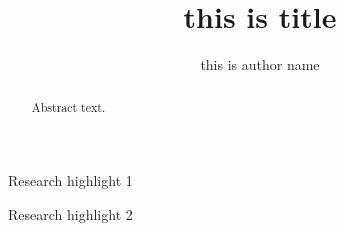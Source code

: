 \documentclass[preprint,12pt]{elsarticle}
\begin{document}
\begin{frontmatter}



\title{this is title} %


\author{this is author name} %


\begin{abstract}
Abstract text.
\end{abstract}

\begin{graphicalabstract}
\end{graphicalabstract}

\begin{highlights}
\item Research highlight 1
\item Research highlight 2
\end{highlights}

\begin{keyword}



\end{keyword}

\end{frontmatter}
\end{document}
